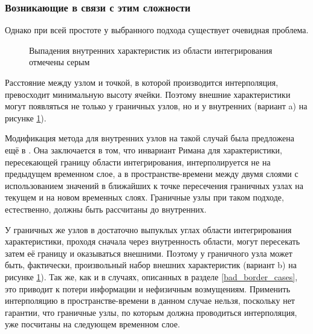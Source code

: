 \documentclass[a4paper]{article}
\numberwithin{equation}{section}
\begin{document}
\subsubsection{Возникающие в связи с этим сложности}
Однако при всей простоте у выбранного подхода существует очевидная проблема. 
\begin{figure}[H]
	\caption{Выпадения внутренних характеристик из области интегрирования отмечены серым}
	\label{pic:gcm-on-triangles-non-courant}
\end{figure}
Расстояние между узлом и точкой, в которой производится интерполяция, 
превосходит минимальную высоту ячейки. Поэтому внешние характеристики могут 
появляться не только у граничных узлов, но и у внутренних 
(вариант a) на рисунке \ref{pic:gcm-on-triangles-non-courant}). 

Модификация метода для внутренних узлов на такой случай 
была предложена ещё в \cite{magomedov_kholodov_1988}. Она заключается в том, 
что инвариант Римана для характеристики, пересекающей границу области интегрирования, 
интерполируется не на предыдущем временном слое, а в пространстве-времени между двумя 
слоями с использованием значений в ближайших к точке пересечения граничных узлах 
на текущем и на новом временных слоях. Граничные узлы при таком подходе, 
естественно, должны быть рассчитаны до внутренних.

У граничных же узлов в достаточно выпуклых углах области интегрирования характеристики, 
проходя сначала через внутренность области, могут пересекать затем её границу 
и оказываться внешними. Поэтому у граничного узла может быть, фактически, 
произвольный набор внешних характеристик 
(вариант b) на рисунке \ref{pic:gcm-on-triangles-non-courant}). 
Так же, как и в случаях, описанных в разделе \ref{bad_border_cases}, 
это приводит к потери информации и нефизичным возмущениям. Применить 
интерполяцию в пространстве-времени в данном случае нельзя, поскольку 
нет гарантии, что граничные узлы, по которым должна проводиться интерполяция, 
уже посчитаны на следующем временном слое. 
\end{document}
